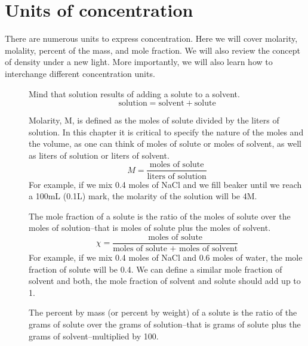 \documentclass[main.tex]{subfiles}
\newcommand\chapterlabel{Ch-solutions}\setcounter{figurenewcounter}{0}\setcounter{tablenewcounter}{0}\setcounter{formulanewcounter}{0}
\begin{document}
\section{Units of concentration}
There are numerous units to express concentration. Here we will cover molarity, molality, percent of the mass, and mole fraction. We will also review the concept of density under a new light. More importantly, we will also learn how to interchange different concentration units.

\sloppy 
\begin{description}
\item[] 
Mind that solution results of adding a solute to a solvent.
\begin{equation}
\text{solution}=\text{solvent} + \text{solute}\label{\chapterlabel:equation1}
\end{equation}
\item[] 
Molarity, M, is defined as the moles of solute divided by the liters of solution. In this chapter it is critical to specify the nature of the moles and the volume, as one can think of moles of solute or moles of solvent, as well as liters of solution or liters of solvent.
\begin{equation}
\boxed{ M=\frac{\text{moles of solute}}{\text{liters of solution}}}\label{\chapterlabel:equation2}
\end{equation}
For example, if we mix 0.4 moles of NaCl and we fill beaker until we reach a 100mL (0.1L) mark, the molarity of the solution will be 4M.
\item[] 
The mole fraction of a solute is the ratio of the moles of solute over the moles of solution--that is moles of solute plus the moles of solvent.
\begin{equation}
\boxed{ \chi=\frac{\text{moles of solute}}{\text{moles of solute + moles of solvent}}}\label{\chapterlabel:equation3}
\end{equation}
For example, if we mix 0.4 moles of NaCl and 0.6 moles of water, the mole fraction of solute will be 0.4. We can define a similar mole fraction of solvent and both, the mole fraction of solvent and solute should add up to 1.
\item[] 
The percent by mass (or percent by weight) of a solute is the ratio of the grams of solute over the grams of solution--that is grams of solute plus the grams of solvent--multiplied by 100.
\begin{equation}

\end{equation}
\end{description}
\end{document}
